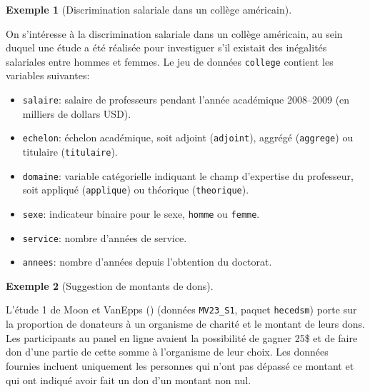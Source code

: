 \documentclass[
  11pt,
  letterpaper,
]{scrbook}
\providecommand{\tightlist}{%
  \setlength{\itemsep}{0pt}\setlength{\parskip}{0pt}}\usepackage{longtable,booktabs,array}
\theoremstyle{plain}
\theoremstyle{plain}
\theoremstyle{definition}
\newtheorem{example}{Exemple}[chapter]
\theoremstyle{definition}
\theoremstyle{remark}
\begin{document}
\begin{example}[Discrimination salariale dans un collège
américain]\protect\hypertarget{exm-college-salary-discrimination}{}\label{exm-college-salary-discrimination}

On s'intéresse à la discrimination salariale dans un collège américain,
au sein duquel une étude a été réalisée pour investiguer s'il existait
des inégalités salariales entre hommes et femmes. Le jeu de données
\texttt{college} contient les variables suivantes:

\begin{itemize}
\tightlist
\item
  \texttt{salaire}: salaire de professeurs pendant l'année académique
  2008--2009 (en milliers de dollars USD).
\item
  \texttt{echelon}: échelon académique, soit adjoint (\texttt{adjoint}),
  aggrégé (\texttt{aggrege}) ou titulaire (\texttt{titulaire}).
\item
  \texttt{domaine}: variable catégorielle indiquant le champ d'expertise
  du professeur, soit appliqué (\texttt{applique}) ou théorique
  (\texttt{theorique}).
\item
  \texttt{sexe}: indicateur binaire pour le sexe, \texttt{homme} ou
  \texttt{femme}.
\item
  \texttt{service}: nombre d'années de service.
\item
  \texttt{annees}: nombre d'années depuis l'obtention du doctorat.
\end{itemize}

\end{example}

\begin{example}[Suggestion de montants de
dons]\protect\hypertarget{exm-moon-vanepps}{}\label{exm-moon-vanepps}

L'étude 1 de Moon et VanEpps ()
(données \texttt{MV23\_S1}, paquet \texttt{hecedsm}) porte sur la
proportion de donateurs à un organisme de charité et le montant de leurs
dons. Les participants au panel en ligne avaient la possibilité de
gagner 25\$ et de faire don d'une partie de cette somme à l'organisme de
leur choix. Les données fournies incluent uniquement les personnes qui
n'ont pas dépassé ce montant et qui ont indiqué avoir fait un don d'un
montant non nul.

\end{example}
\end{document}
